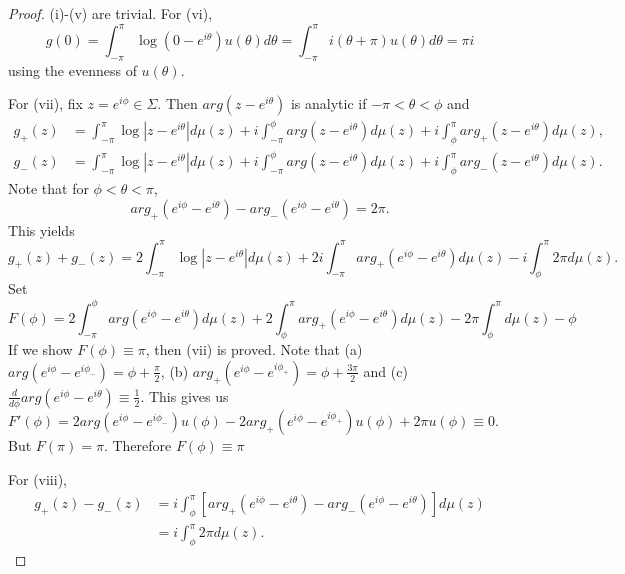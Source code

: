 \documentclass{amsart}
\theoremstyle{definition}
\theoremstyle{remark}
\numberwithin{equation}{section}
\begin{document}
\begin{proof}
  (i)-(v) are trivial. 
For (vi), 
$$g(0)=\int_{-\pi}^{\pi} \log{(0-e^{i\theta})} u(\theta)d\theta
=\int_{-\pi}^{\pi} i(\theta+\pi) u(\theta)d\theta = \pi i$$
using the evenness of $u(\theta)$.

For (vii), fix $z=e^{i\phi}\in\Sigma$. 
Then $arg(z-e^{i\theta})$ is analytic if $-\pi<\theta<\phi$ and 
  \begin{equation*}
    \begin{split}
      g_+(z)&=\int_{-\pi}^{\pi}\log |z-e^{i\theta}| d\mu(z)
+i\int_{-\pi}^{\phi} arg(z-e^{i\theta}) d\mu(z)
+i\int_{\phi}^{\pi} arg_+(z-e^{i\theta}) d\mu(z),\\
      g_-(z)&=\int_{-\pi}^{\pi}\log |z-e^{i\theta}| d\mu(z)
+i\int_{-\pi}^{\phi} arg(z-e^{i\theta}) d\mu(z)
+i\int_{\phi}^{\pi} arg_-(z-e^{i\theta}) d\mu(z).
    \end{split}
  \end{equation*}
  Note that for $\phi <\theta <\pi$, 
$$arg_+(e^{i\phi}-e^{i\theta}) - arg_-(e^{i\phi}-e^{i\theta}) = 2\pi.$$
  This yields
$$g_+(z)+g_-(z)=2\int_{-\pi}^{\pi}\log |z-e^{i\theta}| d\mu(z)
+2i\int_{-\pi}^{\pi}arg_+(e^{i\phi}-e^{i\theta}) d\mu(z)
-i\int_{\phi}^{\pi} 2\pi d\mu(z).$$
  Set 
$$F(\phi)=2\int_{-\pi}^{\phi} arg(e^{i\phi}-e^{i\theta}) d\mu(z)
+2\int_{\phi}^{\pi} arg_+(e^{i\phi}-e^{i\theta}) d\mu(z)
-2\pi\int_{\phi}^{\pi} d\mu(z) -\phi$$
  If we show $F(\phi)\equiv\pi$, then (vii) is proved.
  Note that (a) $arg(e^{i\phi}-e^{i\phi_-})=\phi+\frac{\pi}2$, 
(b) $arg_+(e^{i\phi}-e^{i\phi_+})=\phi+\frac{3\pi}2$ and 
(c) $\frac{d}{d\phi} arg(e^{i\phi}-e^{i\theta}) \equiv \frac12$.
  This gives us $F'(\phi)=2arg(e^{i\phi}-e^{i\phi_-})u(\phi)-2arg_+(e^{i\phi}-e^{i\phi_+})u(\phi)+2\pi u(\phi) \equiv 0$. But $F(\pi)=\pi$. Therefore $F(\phi)\equiv\pi$

  For (viii), 
  \begin{equation*}
    \begin{split}
      g_+(z)-g_-(z)&=i\int_{\phi}^{\pi}
[arg_+(e^{i\phi}-e^{i\theta}) - arg_-(e^{i\phi}-e^{i\theta})] d\mu(z)\\
      &=i\int_{\phi}^{\pi} 2\pi d\mu(z).
    \end{split}
  \end{equation*}
\end{proof}
\end{document}
